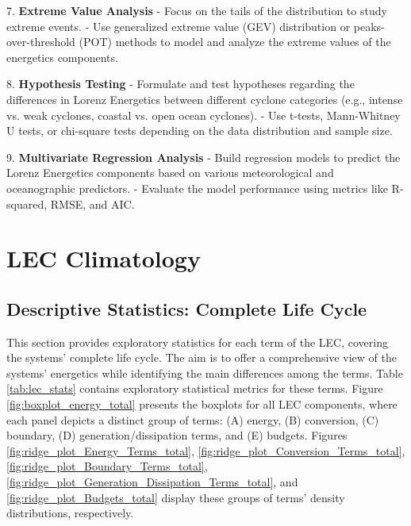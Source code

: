 7. \textbf{Extreme Value Analysis}
    - Focus on the tails of the distribution to study extreme events.
    - Use generalized extreme value (GEV) distribution or peaks-over-threshold (POT) methods to model and analyze the extreme values of the energetics components.

8. \textbf{Hypothesis Testing}
    - Formulate and test hypotheses regarding the differences in Lorenz Energetics between different cyclone categories (e.g., intense vs. weak cyclones, coastal vs. open ocean cyclones).
    - Use t-tests, Mann-Whitney U tests, or chi-square tests depending on the data distribution and sample size.

9. \textbf{Multivariate Regression Analysis}
    - Build regression models to predict the Lorenz Energetics components based on various meteorological and oceanographic predictors.
    - Evaluate the model performance using metrics like R-squared, RMSE, and AIC.



\section{LEC Climatology}\label{sec:climatology}

\subsection{Descriptive Statistics: Complete Life Cycle} \label{sec:statistics_complete}

This section provides exploratory statistics for each term of the LEC, covering the systems' complete life cycle. The aim is to offer a comprehensive view of the systems' energetics while identifying the main differences among the terms. Table \ref{tab:lec_stats} contains exploratory statistical metrics for these terms. Figure \ref{fig:boxplot_energy_total} presents the boxplots for all LEC components, where each panel depicts a distinct group of terms: (A) energy, (B) conversion, (C) boundary, (D) generation/dissipation terms, and (E) budgets. Figures \ref{fig:ridge_plot_Energy_Terms_total}, \ref{fig:ridge_plot_Conversion_Terms_total}, \ref{fig:ridge_plot_Boundary_Terms_total}, \ref{fig:ridge_plot_Generation_Dissipation_Terms_total}, and \ref{fig:ridge_plot_Budgets_total} display these groups of terms' density distributions, respectively.

